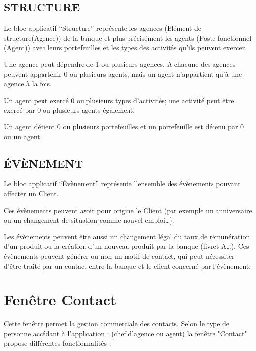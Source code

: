        \subsection{STRUCTURE}

Le bloc applicatif “Structure” représente les agences (Elément de structure(Agence)) de la banque et plus précisément les agents (Poste fonctionnel (Agent)) avec leurs portefeuilles et les types des activités qu’ils peuvent exercer.

Une agence peut dépendre de 1 ou plusieurs agences. A chacune des agences peuvent appartenir 0 ou plusieurs agents, mais un agent n’appartient qu’à une agence à la fois.

Un agent peut exercé 0 ou plusieurs types d’activités; une activité peut être exercé par 0 ou plusieurs agents également.

Un agent détient 0 ou plusieurs portefeuilles et un portefeuille est détenu par 0 ou un agent.

       \subsection{ÉVÈNEMENT}

Le bloc applicatif “Évènement” représente l’ensemble des évènements pouvant affecter un Client.

Ces évènements peuvent avoir pour origine le Client (par exemple un anniversaire ou un changement de situation comme nouvel emploi…).

Les évènements peuvent être aussi un changement légal du taux de rémunération d’un produit ou la création d’un nouveau produit par la banque (livret A…). Ces évènements peuvent générer ou non un motif de contact, qui peut nécessiter d’être traité par  un contact entre la banque et le client concerné par l’évènement.




\section{Fenêtre Contact}
       Cette fenêtre permet la gestion commerciale des contacts. Selon le type de personne accédant à l'application : (chef d’agence ou agent) la fenêtre "Contact" propose différentes fonctionnalités :

